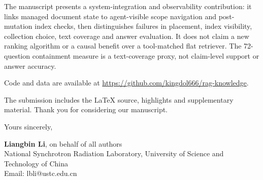 \documentclass[11pt,a4paper]{article}
\begin{document}
The manuscript presents a system-integration and observability contribution:
it links managed document state to agent-visible scope navigation and
post-mutation index checks, then distinguishes failures in placement, index
visibility, collection choice, text coverage and answer evaluation. It does
not claim a new ranking algorithm or a causal benefit over a tool-matched flat
retriever. The 72-question containment measure is a text-coverage proxy, not
claim-level support or answer accuracy.

Code and data are available at \url{https://github.com/kingdol666/rag-knowledge}.

The submission includes the \LaTeX{} source, highlights and supplementary
material. Thank you for considering our manuscript.

Yours sincerely,

\medskip
\textbf{Liangbin Li}, on behalf of all authors\\
{}National Synchrotron Radiation Laboratory, University of Science and Technology of China\\
{}Email: lbli@ustc.edu.cn
\end{document}

